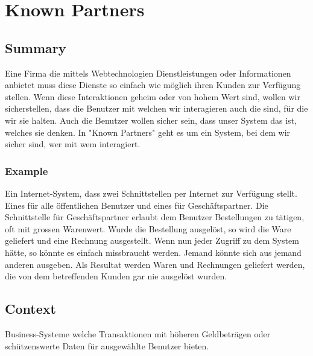 \chapter{Known Partners}

\section{Summary}
Eine Firma die mittels Webtechnologien Dienstleistungen oder Informationen anbietet muss diese Dienste so einfach wie möglich ihren Kunden zur Verfügung stellen. Wenn diese Interaktionen geheim oder von hohem Wert sind, wollen wir sicherstellen, dass die Benutzer mit welchen wir interagieren auch die sind, für die wir sie halten. Auch die Benutzer wollen sicher sein, dass unser System das ist, welches sie denken. In "Known Partners" geht es um ein System, bei dem wir sicher sind, wer mit wem interagiert.
\subsection{Example}
Ein Internet-System, dass zwei Schnittstellen per Internet zur Verfügung stellt. Eines für alle öffentlichen Benutzer und eines für Geschäftspartner. Die Schnittstelle für Geschäftspartner erlaubt dem Benutzer Bestellungen zu tätigen, oft mit grossen Warenwert. Wurde die Bestellung ausgelöst, so wird die Ware geliefert und eine Rechnung ausgestellt. Wenn nun jeder Zugriff zu dem System hätte, so könnte es einfach missbraucht werden. Jemand könnte sich aus jemand anderen ausgeben. Als Resultat werden Waren und Rechnungen geliefert werden, die von dem betreffenden Kunden gar nie ausgelöst wurden.

\section{Context}
Business-Systeme welche Transaktionen mit höheren Geldbeträgen oder schützenswerte Daten für ausgewählte Benutzer bieten.


